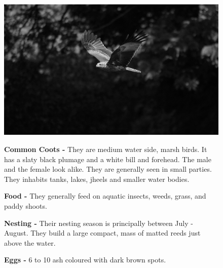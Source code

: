 \begin{figure}[H]
\begin{center}
\includegraphics{figure/Land_birds/01_pariah_kite/pariah-kite.eps}
\end{center}
\medskip
\noindent
{\bf Common Coots -} They are medium water side, marsh birds. It has a slaty black plumage and a white bill and forehead. The male and the female look alike. They are generally seen in small parties. They inhabits tanks, lakes, jheels and smaller water bodies. 

\medskip
{\bf Food -} They generally feed on aquatic insects, weeds, grass, and paddy shoots. 

{\bf Nesting -} Their nesting season is principally between July - August. They build a large compact, mass of matted reeds just above the water.

{\bf Eggs -} 6 to 10 ash coloured with dark brown spots.
\end{figure}

\vfill\eject

~\phantom{a}
\vfill

